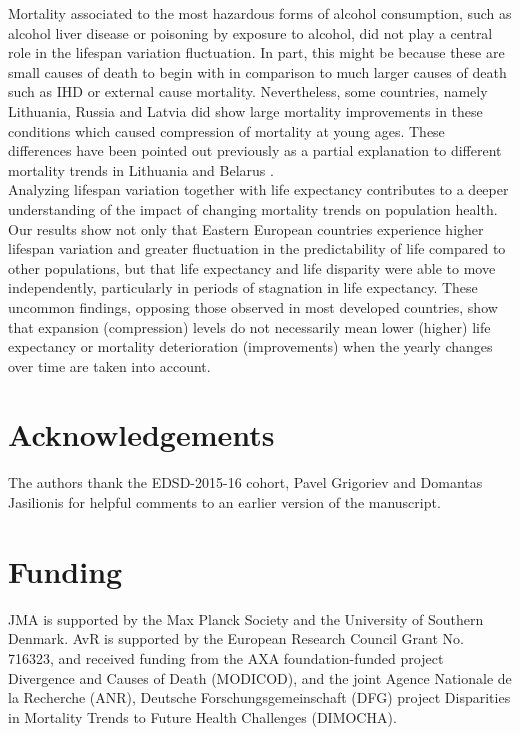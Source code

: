 \documentclass{article}
\begin{document}
\begin{spacing}{1.5}
Mortality associated to the most hazardous forms of alcohol consumption, such as alcohol liver disease or poisoning by exposure to alcohol, did not play a central role in the lifespan variation fluctuation. In part, this might be because these are small causes of death to begin with in comparison to much larger causes of death such as IHD or external cause mortality. Nevertheless, some countries, namely Lithuania, Russia and Latvia did show large mortality improvements in these conditions which caused compression of mortality at young ages. These differences have been pointed out previously as a partial explanation to different mortality trends in Lithuania and Belarus \citep{grigoriev2015spatial}.\\

Analyzing lifespan variation together with life expectancy contributes to a deeper understanding of the impact of changing mortality trends on population health. Our results show not only that Eastern European countries experience higher lifespan variation and greater fluctuation in the predictability of life compared to other populations, but that life expectancy and life disparity were able to move independently, particularly in periods of stagnation in life expectancy. These uncommon findings, opposing those observed in most developed countries, show that expansion (compression) levels do not necessarily mean lower (higher) life expectancy  or mortality deterioration (improvements) when the yearly changes over time are taken into account. \\



\section*{Acknowledgements}
The authors thank the EDSD-2015-16 cohort, Pavel Grigoriev and Domantas Jasilionis for helpful comments to an earlier version of the manuscript. 

\section*{Funding}
JMA is supported by the Max Planck Society and the University of Southern Denmark. AvR is supported by the European Research Council Grant No. 716323, and received funding from the AXA foundation-funded project Divergence and Causes of Death (MODICOD), and the joint Agence Nationale de la Recherche (ANR), Deutsche Forschungsgemeinschaft (DFG) project Disparities in Mortality Trends to Future Health Challenges (DIMOCHA). 

\end{spacing}
\end{document}
